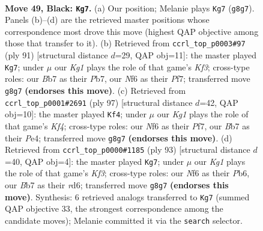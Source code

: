 \documentclass[11pt]{article}
\begin{document}
\clearpage

\begin{figure}[p]\centering
\begin{subfigure}{0.46\textwidth}\centering
\resizebox{\linewidth}{!}{%
\newchessgame
\chessboard[
  setfen={6k1/1b3p2/5np1/8/7P/3q4/1R2R2P/5NK1 b - - 6 49},
  showmover=false,
  pgfstyle=straightmove, color=movearrow, markmove={g8-g7}
]}
\caption{}
\end{subfigure}\hfill
\begin{subfigure}{0.46\textwidth}\centering
\resizebox{\linewidth}{!}{%
\newchessgame
\chessboard[
  setfen={8/1p3p2/5k2/1R6/4q1pP/8/5P1P/1R4K1 b - - 2 46},
  showmover=false,
  pgfstyle=straightmove, color=movearrow, markmove={f6-g7}
]}
\caption{}
\end{subfigure}
\\[4pt]
\begin{subfigure}{0.46\textwidth}\centering
\resizebox{\linewidth}{!}{%
\newchessgame
\chessboard[
  setfen={8/5pp1/7p/5k2/1q2p3/4R2P/5PP1/4R1K1 b - - 5 49},
  showmover=false,
  pgfstyle=straightmove, color=movearrow, markmove={f5-f4}
]}
\caption{}
\end{subfigure}\hfill
\begin{subfigure}{0.46\textwidth}\centering
\resizebox{\linewidth}{!}{%
\newchessgame
\chessboard[
  setfen={8/p7/1p1R1k1p/1P4p1/8/q7/6PP/3R3K b - - 7 47},
  showmover=false,
  pgfstyle=straightmove, color=movearrow, markmove={f6-g7}
]}
\caption{}
\end{subfigure}
\caption{\textbf{Move 49, Black: \texttt{Kg7}.} (a) Our position; Melanie plays \texttt{Kg7} (\texttt{g8g7}). Panels (b)--(d) are the retrieved master positions whose correspondence most drove this move (highest QAP objective among those that transfer to it). (b) Retrieved from \texttt{ccrl\_top\_p0003\#97} (ply 91) [structural distance $d$=29, QAP obj=11]: the master played \texttt{Kg7}; under $\mu$ our \emph{Kg1} plays the role of that game's \emph{Kf3}; cross-type roles: our \emph{B}b7 as their \emph{P}b7, our \emph{N}f6 as their \emph{P}f7; transferred move \texttt{g8g7} \textbf{(endorses this move)}. (c) Retrieved from \texttt{ccrl\_top\_p0001\#2691} (ply 97) [structural distance $d$=42, QAP obj=10]: the master played \texttt{Kf4}; under $\mu$ our \emph{Kg1} plays the role of that game's \emph{Kf4}; cross-type roles: our \emph{N}f6 as their \emph{P}f7, our \emph{B}b7 as their \emph{P}e4; transferred move \texttt{g8g7} \textbf{(endorses this move)}. (d) Retrieved from \texttt{ccrl\_top\_p0000\#1185} (ply 93) [structural distance $d$=40, QAP obj=4]: the master played \texttt{Kg7}; under $\mu$ our \emph{Kg1} plays the role of that game's \emph{Kf3}; cross-type roles: our \emph{N}f6 as their \emph{P}b6, our \emph{B}b7 as their \emph{r}d6; transferred move \texttt{g8g7} \textbf{(endorses this move)}. Synthesis: 6 retrieved analogs transferred to \texttt{Kg7} (summed QAP objective 33, the strongest correspondence among the candidate moves); Melanie committed it via the \texttt{search} selector.}
\label{fig:thought-m97}
\end{figure}
\end{document}
